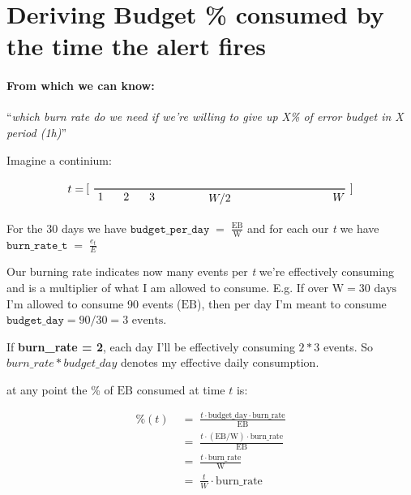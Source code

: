 \documentclass{article}
\begin{document}
\section{Deriving Budget \% consumed by the time the alert fires}

\paragraph{From which we can know:}
``\textit{which burn rate do we need if we're willing to give up X\% of error budget in X period (1h)}''

\quad

\noindent Imagine a continium:

$$
\begin{tikzpicture}[baseline=(current bounding box.center)]
    \node[left] at (0, 0) {$t=$};

    \node at (0.0, 0) {$[$};
    \node at (8.2, 0) {$]$};

    \draw[thick] (0.2, 0) -- (8.0, 0);

    \node[below] at (0.4, 0) {$1$};
    \node[below] at (1.2, 0) {$2$};
    \node[below] at (2.0, 0) {$3$};
    \node[below] at (4.1, 0) {$W/2$};
    \node[below] at (7.8, 0) {$W$};
\end{tikzpicture}
$$

\noindent For the 30 days we have $\texttt{budget\_per\_day} \;=\; \displaystyle \frac{\mathrm{EB}}{\mathrm{W}}$ and for each our \emph{t} we have $\texttt{burn\_rate\_t} \;=\; \displaystyle \frac{e_t}{E}$

\quad

\noindent Our burning rate indicates now many events per \emph{t} we're effectively consuming and is
a multiplier of what I am allowed to consume. E.g. If over $\mathrm{W = \text{30 days}}$ I'm allowed
to consume 90 events ($\mathrm{EB}$), then per day I'm meant to consume $\texttt{budget\_day} = 90/30 = \text{3 events}$.

\quad

If \textbf{burn\_rate = 2}, each day I'll be effectively consuming $2 * 3$ events. So $burn\_rate * budget\_day$ denotes my effective daily consumption.

\quad

at any point the \% of $\mathrm{EB}$ consumed at time $t$ is:

\begin{align*}
\%(t) & \;=\; \frac{t \cdot \mathrm{budget\_day} \cdot \mathrm{burn\_rate}}{\mathrm{EB}} \\
& \;=\; \frac{t \cdot \mathrm{(EB / W)} \cdot \mathrm{burn\_rate}}{\mathrm{EB}} \\
& \;=\; \frac{t \cdot \mathrm{burn\_rate}}{\mathrm{W}} \\
& \;=\; \frac{t}{W} \cdot \mathrm{burn\_rate}
\end{align*}
\end{document}
